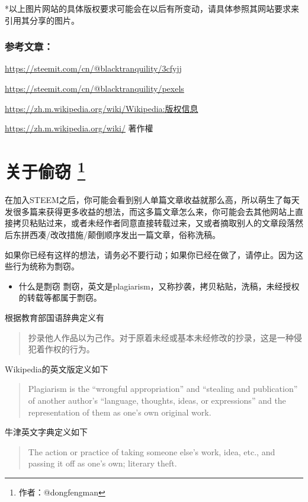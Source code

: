 \documentclass[]{ctexbook}
\providecommand{\tightlist}{%
  \setlength{\itemsep}{0pt}\setlength{\parskip}{0pt}}
\begin{document}
*以上图片网站的具体版权要求可能会在以后有所变动，请具体参照其网站要求来引用其分享的图片。

\subsubsection{参考文章：}

\url{https://steemit.com/cn/@blacktranquility/3cfyjj}

\url{https://steemit.com/cn/@blacktranquility/pexels}

\url{https://zh.m.wikipedia.org/wiki/Wikipedia:版权信息}

\url{https://zh.m.wikipedia.org/wiki/}
著作權

\section[关于偷窃 ]{\texorpdfstring{关于偷窃 \footnote{作者：@dongfengman}}{关于偷窃 }}

在加入STEEM之后，你可能会看到别人单篇文章收益就那么高，所以萌生了每天发很多篇来获得更多收益的想法，而这多篇文章怎么来，你可能会去其他网站上直接拷贝粘贴过来，或者未经作者同意直接转载过来，又或者摘取别人的文章段落然后东拼西凑/改改措施/颠倒顺序发出一篇文章，俗称洗稿。

如果你已经有这样的想法，请务必不要行动；如果你已经在做了，请停止。因为这些行为统称为剽窃。

\begin{itemize}
\tightlist
\item
  什么是剽窃
  剽窃，英文是plagiarism，又称抄袭，拷贝粘贴，洗稿，未经授权的转载等都属于剽窃。
\end{itemize}

根据教育部国语辞典定义有

\begin{quote}
抄录他人作品以为己作。对于原着未经或基本未经修改的抄录，这是一种侵犯着作权的行为。
\end{quote}

Wikipedia的英文版定义如下

\begin{quote}
Plagiarism is the ``wrongful appropriation'' and ``stealing and publication'' of another author's ``language, thoughts, ideas, or expressions'' and the representation of them as one's own original work.
\end{quote}

牛津英文字典定义如下

\begin{quote}
The action or practice of taking someone else's work, idea, etc., and passing it off as one's own; literary theft.
\end{quote}
\end{document}
